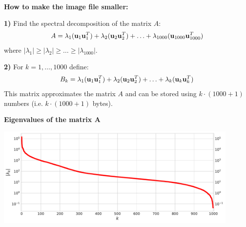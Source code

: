 {\vskip  20mm

{\bf How to make the image file smaller:}

\vskip 5mm

{\bf 1)} Find the spectral decomposition of the matrix $A$:
$$A = \lambda_{1}({\bf u}_{1}{\bf u}_{1}^{T}) + \lambda_{2}({\bf u}_{2}{\bf u}_{2}^{T}) + {\dots} + \lambda_{1000}({\bf u}_{1000}{\bf u}_{1000}^{T})$$ 
where $|\lambda_{1}| \geq |\lambda_{2}| \geq {\dots} \geq |\lambda_{1000}|$.

\vskip 20mm

{\bf 2)} For $k = 1, \dots, 1000$ define:
$$B_{k} = \lambda_{1}({\bf u}_{1}{\bf u}_{1}^{T}) + \lambda_{2}({\bf u}_{2}{\bf u}_{2}^{T}) + {\dots} + \lambda_{k}({\bf u}_{k}{\bf u}_{k}^{T})$$ 
This matrix approximates the matrix $A$ and can be stored using $k\cdot(1000 + 1)$ numbers 
(i.e. $k\cdot(1000 + 1)$ bytes).  


\newpage

\begin{center}
{\bf Eigenvalues of the matrix $\mathbf A$}
\vskip 5mm

\includegraphics[width=0.9\textwidth]{einstein_eigenvalues.pdf}
\end{center}

\vskip 20mm

}
